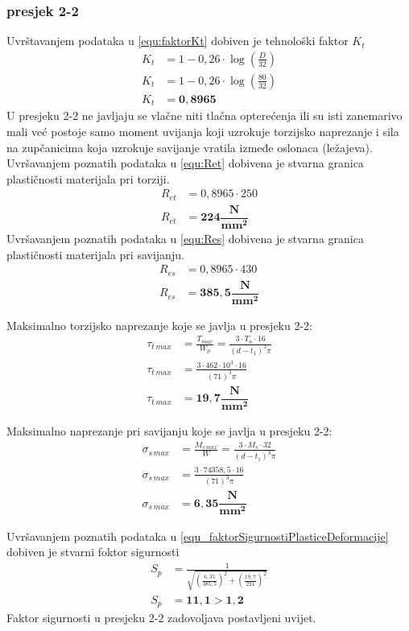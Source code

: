 \documentclass[11pt,a4paper]{report}
\begin{document}
\subsubsection{presjek 2-2}
Uvrštavanjem podataka u \eqref{equ:faktorKt} dobiven je tehnološki faktor $K_t$
\begin{align*}
K_t&=1-0,26\cdot \log \left( \frac{D}{32} \right)\\
K_t&=1-0,26\cdot \log \left( \frac{80}{32} \right)\\
K_t&=\mathbf{0,8965}
\end{align*}
U presjeku 2-2 ne javljaju se vlačne niti tlačna opterećenja ili su isti zanemarivo mali već postoje samo moment uvijanja koji uzrokuje torzijsko naprezanje i sila na zupčanicima koja uzrokuje savijanje vratila izmeđe oslonaca (ležajeva).
Uvršavanjem poznatih podataka u \eqref{equ:Ret} dobivena je stvarna granica plastičnosti materijala pri torziji.
\begin{align*}
R_{et}&=0,8965 \cdot 250\\
R_{et}&=\mathbf{224 \dfrac{N}{mm^2}}
\end{align*}
Uvršavanjem poznatih podataka u \eqref{equ:Res} dobivena je stvarna granica plastičnosti materijala pri savijanju.
\begin{align*}
R_{es}&=0,8965 \cdot 430\\
R_{es}&=\mathbf{385,5 \dfrac{N}{mm^2}}
\end{align*}

Maksimalno torzijsko naprezanje koje se javlja u presjeku 2-2:
\begin{align*}
\tau_{t \, max}&=\frac{T_{max}}{W_p}=\frac{3 \cdot T_n \cdot 16}{(d-t_1)^3 \pi}\\
\tau_{t \, max}&=\frac{3 \cdot 462\cdot 10^3 \cdot 16}{(71)^3 \pi}\\
\tau_{t \, max}&=\mathbf{19,7 \dfrac{N}{mm^2}}
\end{align*}

Maksimalno naprezanje pri savijanju koje se javlja u presjeku 2-2:
\begin{align*}
\sigma_{s \, max}&=\frac{M_{s \, max}}{W}=\frac{3 \cdot M_s \cdot 32}{(d-t_1)^3 \pi}\\
\sigma_{s \, max}&=\frac{3 \cdot 74358,5  \cdot 16}{(71)^3 \pi}\\
\sigma_{s \, max}&=\mathbf{6,35 \dfrac{N}{mm^2}}
\end{align*}

Uvršavanjem poznatih podataka u \eqref{equ_faktorSigurnostiPlasticeDeformacije} dobiven je stvarni foktor sigurnosti
\begin{align*}
S_p&=\frac{1}{\sqrt{\left( \frac{6,35}{385,5}\right)^2+ \left(\frac{19,7}{224}\right)^2}}\\
S_p&=\mathbf{11,1 > 1,2}
\end{align*}
Faktor sigurnosti u presjeku 2-2 zadovoljava postavljeni uvijet.
\end{document}
